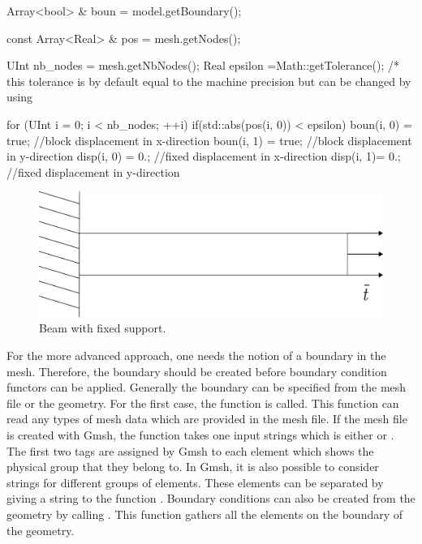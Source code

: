 \begin{cpp} 
Array<bool> & boun = model.getBoundary();

const Array<Real> & pos = mesh.getNodes();

UInt nb_nodes = mesh.getNbNodes(); 
Real epsilon =Math::getTolerance(); 
/* this tolerance is by default equal to the machine precision but can be changed by using %

for (UInt i = 0; i < nb_nodes; ++i) { 
  if(std::abs(pos(i, 0)) < epsilon) { 
    boun(i, 0) = true; //block displacement in x-direction
    boun(i, 1) = true; //block displacement in y-direction
    disp(i, 0) = 0.; //fixed displacement in x-direction 
    disp(i, 1)= 0.; //fixed displacement in y-direction 
  } 
}
\end{cpp}
\begin{figure}[!htb] 
  \centering
  \includegraphics[scale=0.4]{figures/dirichlet}
  \caption{Beam with fixed support.\label{fig:smm:dirichlet_bc}}
\end{figure}

For the more advanced approach, one needs the notion of a boundary in
the mesh. Therefore, the boundary should be created before boundary
condition functors can be applied. Generally the boundary can be
specified from the mesh file or the geometry.  For the first case, the
function  is called.  This function
can read any types of mesh data which are provided in the mesh
file. If the mesh file is created with Gmsh, the function takes one
input strings which is either  or
. The first two tags are assigned by Gmsh to
each element which shows the physical group that they belong to. In
Gmsh, it is also possible to consider strings for different groups of
elements. These elements can be separated by giving a string
 to the function
.  Boundary conditions can also be
created from the geometry by calling
. This function gathers all the
elements on the boundary of the geometry.

